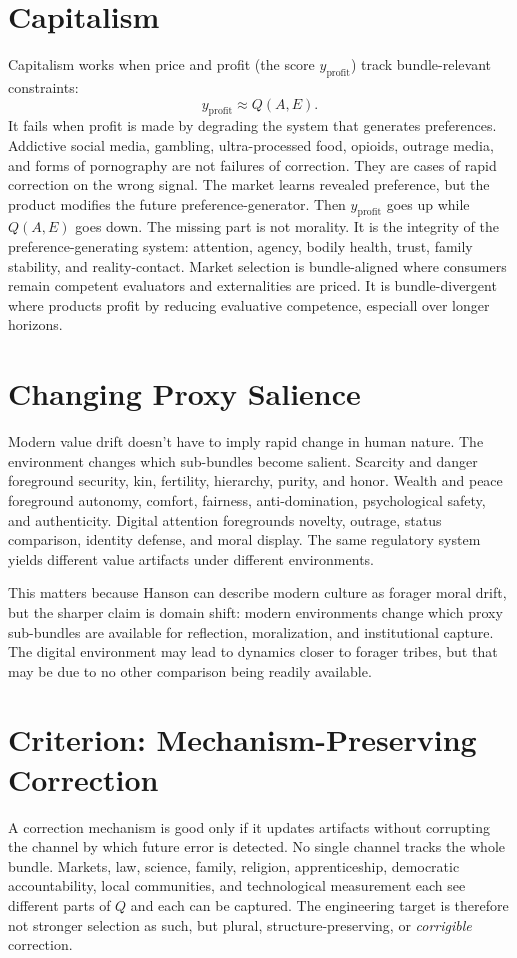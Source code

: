 \documentclass[11pt]{article}
\begin{document}
\section{Capitalism}
Capitalism works when price and profit (the score $y_{\mathrm{profit}}$) track bundle-relevant constraints:
\begin{equation}
y_{\mathrm{profit}} \approx Q(A, E).
\end{equation}
It fails when profit is made by degrading the system that generates preferences. 
Addictive social media, gambling, ultra-processed food, opioids, outrage media, and forms of pornography are not failures of correction. They are cases of rapid correction on the wrong signal. The market learns revealed preference, but the product modifies the future preference-generator. 
Then $y_{\mathrm{profit}}$ goes up while $Q(A,E)$ goes down.
The missing part is not morality. It is the integrity of the preference-generating system: attention, agency, bodily health, trust, family stability, and reality-contact. Market selection is bundle-aligned where consumers remain competent evaluators and externalities are priced. 
It is bundle-divergent where products profit by reducing evaluative competence, especiall over longer horizons.

\section{Changing Proxy Salience}
Modern value drift doesn't have to imply rapid change in human nature. 
The environment changes which sub-bundles become salient.
Scarcity and danger foreground security, kin, fertility, hierarchy, purity, and honor. 
Wealth and peace foreground autonomy, comfort, fairness, anti-domination, psychological safety, and authenticity. 
Digital attention foregrounds novelty, outrage, status comparison, identity defense, and moral display. 
The same regulatory system yields different value artifacts under different environments.

This matters because Hanson can describe modern culture as forager moral drift, but the sharper claim is domain shift: modern environments change which proxy sub-bundles are available for reflection, moralization, and institutional capture.
The digital environment may lead to dynamics closer to forager tribes, but that may be due to no other comparison being readily available.

\section{Criterion: Mechanism-Preserving Correction}
A correction mechanism is good only if it updates artifacts without corrupting the channel by which future error is detected. 
No single channel tracks the whole bundle. Markets, law, science, family, religion, apprenticeship, democratic accountability, local communities, and technological measurement each see different parts of $Q$ and each can be captured. 
The engineering target is therefore not stronger selection as such, but plural, structure-preserving, or \emph{corrigible} correction.
\end{document}
